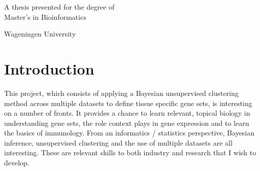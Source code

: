 \documentclass[11pt]{article} %
\providecommand{\keywords}[1]
{
	\small	
	\textbf{\textit{Keywords---}} #1
}
\begin{document}
\begin{titlepage}
\begin{center}
			\vfill
			

			
			
			A thesis presented for the degree of\\
			Master's in Bioinformatics
			
			\vspace{0.8cm}
			
			
			Wageningen University
			
		\end{center}
	\end{titlepage}
	


	
	
	
	\section{Introduction}
	This project, which consists of applying a Bayesian unsupervised clustering method across multiple datasets to define tissue specific gene sets, is interesting on a number of fronts. It provides a chance to learn relevant, topical biology in understanding gene sets, the role context plays in gene expression and to learn the basics of immunology. From an informatics / statistics perspective, Bayesian inference, unsupervised clustering and the use of multiple datasets are all interesting. These are relevant skills to both industry and research that I wish to develop.
	
\end{document}
